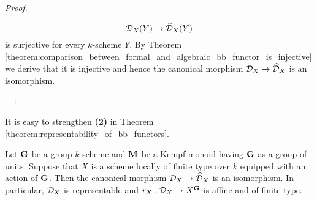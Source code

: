 \begin{proof}
\begin{itemize}
$${\mathcal D}_X(Y)\rightarrow \widehat{{\mathcal D}}_X(Y)$$
is surjective for every $k$-scheme $Y$. By Theorem \ref{theorem:comparison_between_formal_and_algebraic_bb_functor_is_injective} we derive that it is injective and hence the canonical morphism ${\mathcal D}_X\rightarrow \widehat{{\mathcal D}}_X$ is an isomorphism.
\end{itemize}
\end{proof}
\noindent
It is easy to strengthen \textbf{(2)} in Theorem \ref{theorem:representability_of_bb_functors}.

\begin{corollary}\label{corollary:formal_and_algebraic_bb_functor_are_isomorphic_for_k_schemes_locally_of_finite_type}
Let $\mathbf{G}$ be a group $k$-scheme and $\mathbf{M}$ be a Kempf monoid having $\mathbf{G}$ as a group of units. Suppose that $X$ is a scheme locally of finite type over $k$ equipped with an action of $\mathbf{G}$. Then the canonical morphism ${\mathcal D}_X\rightarrow \widehat{{\mathcal D}}_X$ is an isomorphism. In particular, ${\mathcal D}_X$ is representable and $r_X:{\mathcal D}_X\rightarrow X^{\mathbf{G}}$ is affine and of finite type.
\end{corollary}
